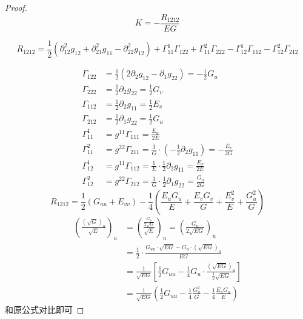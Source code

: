 \documentclass[lang=cn,10pt,thmcnt=section]{elegantbook}
\begin{document}
\begin{proof}
    \[K=-\frac{R_{1212}}{EG}\]

    \[
        R_{1212}=\frac{1}{2}(\partial^2_{12}g_{12}+\partial^2_{21}g_{11}-\partial^2_{22}g_{12})+\Gamma_{11}^1\Gamma_{122}+\Gamma_{11}^2\Gamma_{222}-\Gamma_{12}^1\Gamma_{112}-\Gamma_{12}^2\Gamma_{212}
    \]

    \begin{align*}
        \Gamma_{122} &= \frac{1}{2} (2\partial_2 g_{12} - \partial_1 g_{22}) = -\frac{1}{2} G_u \\
        \Gamma_{222} &= \frac{1}{2} \partial_2 g_{22} = \frac{1}{2} G_v \\
        \Gamma_{112} &= \frac{1}{2} \partial_2 g_{11} = \frac{1}{2} E_v \\
        \Gamma_{212} &= \frac{1}{2} \partial_1 g_{22} = \frac{1}{2} G_u \\
        \Gamma_{11}^1 &= g^{11} \Gamma_{111} = \frac{E_u}{2E} \\
        \Gamma_{11}^2 &= g^{22} \Gamma_{211} = \frac{1}{G} \cdot \left( -\frac{1}{2} \partial_2 g_{11} \right) = -\frac{E_v}{2G} \\
        \Gamma_{12}^1 &= g^{11} \Gamma_{112} = \frac{1}{E} \cdot \frac{1}{2} \partial_2 g_{11} = \frac{E_v}{2E} \\
        \Gamma_{12}^2 &= g^{22} \Gamma_{212} = \frac{1}{G} \cdot \frac{1}{2} \partial_1 g_{22} = \frac{G_u}{2G}
    \end{align*}
\[
R_{1212} = \frac{1}{2} (G_{uu} + E_{vv}) - \frac{1}{4} \left( \frac{E_u G_u}{E} + \frac{E_v G_v}{G} + \frac{E_v^2}{E} + \frac{G_u^2}{G} \right)
\]
\begin{align*}
    \left(\frac{(\sqrt{G})_u}{\sqrt{E}}\right)_u 
    &= \left(\frac{\frac{G_u}{2\sqrt{G}}}{\sqrt{E}}\right)_u 
    = \left(\frac{G_u}{2\sqrt{EG}}\right)_u \\
    &= \frac{1}{2} \cdot \frac{G_{uu} \cdot \sqrt{EG} - G_u \cdot (\sqrt{EG})_u}{EG} \\
    &= \frac{1}{\sqrt{EG}} \left[ \frac{1}{2} G_{uu} - \frac{1}{4} G_u \cdot \frac{(\sqrt{EG})_u}{\frac{1}{2}\sqrt{EG}} \right] \\
    &= \frac{1}{\sqrt{EG}} \left( \frac{1}{2} G_{uu} - \frac{1}{4} \frac{G_u^2}{G} - \frac{1}{4} \frac{E_u G_u}{E} \right)
\end{align*}
和原公式对比即可

\end{proof}
\end{document}
